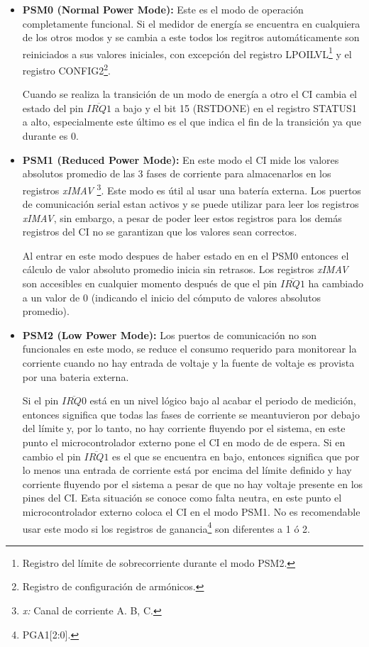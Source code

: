 \documentclass[letterpaper,12pt,oneside]{book}
\begin{document}
			\begin{itemize}
				\item \textbf{PSM0 (Normal Power Mode):} Este es el modo de operación completamente funcional.
				Si el medidor de energía se encuentra en cualquiera de los otros modos y se cambia a este todos los regitros automáticamente son reiniciados a sus valores iniciales, con excepción del registro LPOILVL\footnote{Registro del límite de sobrecorriente durante el modo PSM2.} y el registro CONFIG2\footnote{Registro de configuración de armónicos.}.

				Cuando se realiza la transición de un modo de energía a otro el CI cambia el estado del pin $\overline{IRQ1}$ a bajo y el bit 15 (RSTDONE) en el registro STATUS1 a alto, especialmente este último es el que indica el fin de la transición ya que durante es 0.

				\item \textbf{PSM1 (Reduced Power Mode):} En este modo el CI mide los valores absolutos promedio de las 3 fases de corriente para almacenarlos en los registros \textit{xIMAV} \footnote{\textit{x:} Canal de corriente  A. B, C.}. 
				Este modo es útil al usar una batería externa. Los puertos de comunicación serial estan activos y se puede utilizar para leer los registros \textit{xIMAV}, sin embargo, a pesar de poder leer estos registros para los demás registros del CI no se garantizan que los valores sean correctos.

				Al entrar en este modo despues de haber estado en en el PSM0 entonces el cálculo de valor absoluto promedio inicia sin retrasos. Los registros \textit{xIMAV} son accesibles en cualquier momento después de que el pin $\overline{IRQ1}$ ha cambiado a un valor de 0 (indicando el inicio del cómputo de valores absolutos promedio).

				\item \textbf{PSM2 (Low Power Mode):} Los puertos de comunicación no son funcionales en este modo, se reduce el consumo requerido para monitorear la corriente cuando no hay entrada de voltaje y la fuente de voltaje es provista por una bateria externa.

				Si el pin $\overline{IRQ0}$ está en un nivel lógico bajo al acabar el periodo de medición, entonces significa que todas las fases de corriente se meantuvieron por debajo del límite y, por lo tanto, no hay corriente fluyendo por el sistema, en este punto el microcontrolador externo pone el CI en modo de de espera. Si en cambio el pin $\overline{IRQ1}$ es el que se encuentra en bajo, entonces significa que por lo menos una entrada de corriente está por encima del límite definido y hay corriente fluyendo por el sistema a pesar de que no hay voltaje presente en los pines del CI. Esta situación se conoce como falta neutra, en este punto el microcontrolador externo coloca el CI en el modo PSM1. No es recomendable usar este modo si los registros de ganancia\footnote{PGA1[2:0].} son diferentes a 1 ó 2.


\end{itemize}
\end{document}
